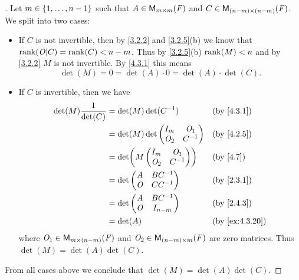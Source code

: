 \begin{proof}[]
	Let \(m \in \left\lbrace1, \dots, n - 1\right\rbrace\) such that \(A \in \mathsf{M}_{{m} \times m}({\mathit{F}})\) and \(C \in \mathsf{M}_{{(n - m)} \times (n - m)}({\mathit{F}})\).
	We split into two cases:
	\begin{itemize}
		\item If \(C\) is not invertible, then by \cref{3.2.2} and \cref{3.2.5}(b) we know that \(\rk{\zm | C} = \rk{C} < n - m\).
		      Thus by \cref{3.2.5}(b) \(\rk{M} < n\) and by \cref{3.2.2} \(M\) is not invertible.
		      By \cref{4.3.1} this means
		      \[
			      \det(M) = 0 = \det(A) \cdot 0 = \det(A) \cdot \det(C).
		      \]
		\item If \(C\) is invertible, then we have
		      \begin{align*}
			      \det(M) \frac{1}{\det(C)} & = \det(M) \det(C^{-1})        &  & \by{4.3.1}     \\
			                                & = \det(M) \det\begin{pmatrix}
				                                                I_m   & \zm_1  \\
				                                                \zm_2 & C^{-1}
			                                                \end{pmatrix} &  & \by{4.2.5}       \\
			                                & = \det\pa{M \begin{pmatrix}
					                                              I_m   & \zm_1  \\
					                                              \zm_2 & C^{-1}
				                                              \end{pmatrix}}   &  & \by{4.7}        \\
			                                & = \det\begin{pmatrix}
				                                        A   & BC^{-1} \\
				                                        \zm & CC^{-1}
			                                        \end{pmatrix}         &  & \by{2.3.1}       \\
			                                & = \det\begin{pmatrix}
				                                        A   & BC^{-1}   \\
				                                        \zm & I_{n - m}
			                                        \end{pmatrix}         &  & \by{2.4.3}       \\
			                                & = \det(A)                     &  & \by{ex:4.3.20}
		      \end{align*}
		      where \(\mathit{O}_1 \in \mathsf{M}_{{m} \times (n - m)}({\mathit{F}})\) and \(\mathit{O}_2 \in \mathsf{M}_{{(n - m)} \times m}({\mathit{F}})\) are zero matrices.
		      Thus \(\det(M) = \det(A) \det(C)\).
	\end{itemize}
	From all cases above we conclude that \(\det(M) = \det(A) \det(C)\).
\end{proof}

